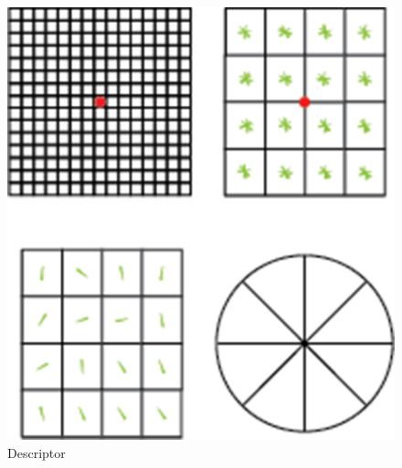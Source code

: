 	\begin{figure}[h]
			\centering
				\includegraphics[scale=0.5]{img/Descriptor.png}
			\caption{Descriptor }
	\end{figure}
		
 
 



